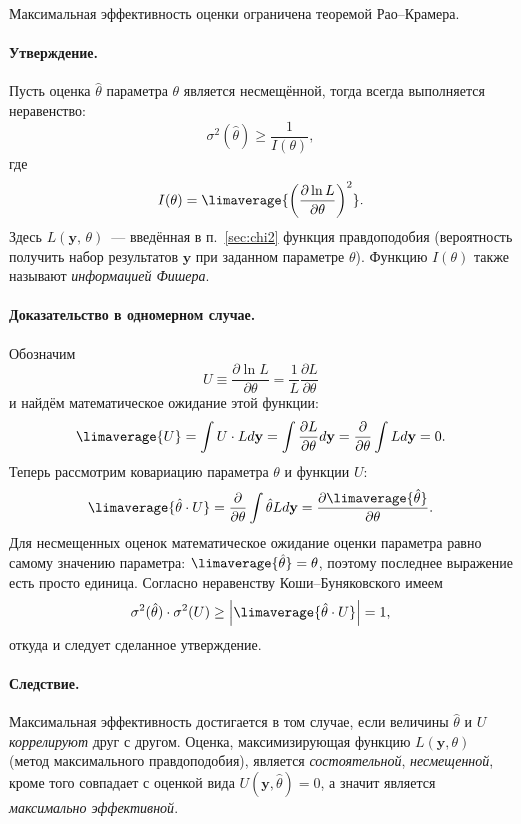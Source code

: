 Максимальная эффективность оценки ограничена теоремой Рао--Крамера.
\paragraph{Утверждение.}
Пусть оценка $\hat\theta$ параметра $\theta$ является несмещённой, тогда
всегда выполняется неравенство:
\begin{equation}
  \sigma^2(\hat\theta) \geq \frac{1}{I(\theta)},
\end{equation}
где
\begin{equation}
    I(\theta) =
    \limaverage{\left(\frac{\partial \ln L}{\partial \theta}\right)^2}.
\end{equation}
Здесь $L(\mathbf{y},\,\theta)$~--- введённая в п.~\ref{sec:chi2} функция правдоподобия
(вероятность получить набор результатов $\mathbf{y}$ при заданном параметре
$\theta$). Функцию $I(\theta)$ также называют \emph{информацией Фишера}.

\paragraph{Доказательство в одномерном случае.}
Обозначим
\[
U \equiv \frac{\partial \ln L} {\partial \theta} =
\frac{1}{L}\frac{\partial L}{\partial \theta}
\]
и найдём математическое ожидание этой функции:
\[
\limaverage{U} =
\int U\cdot L  d\mathbf{y} =
\int \frac{\partial L}{\partial \theta} d\mathbf{y} =
\frac{\partial}{\partial \theta} \int{L d\mathbf{y}} = 0.
\]
Теперь рассмотрим ковариацию параметра $\theta$ и функции
$U$:
\begin{equation}
\limaverage{\hat\theta\cdot U} 
= \frac{\partial}{\partial \theta} \int{\hat\theta L d\mathbf{y}} =
\frac{\partial \limaverage{\hat\theta}}{\partial \theta}.
\end{equation}
Для несмещенных оценок математическое ожидание оценки параметра равно
самому значению параметра: $\limaverage{\hat{\theta}} = \theta$,
поэтому последнее выражение есть просто единица.
Согласно неравенству Коши--Буняковского имеем
\[
\sigma^2 (\hat\theta) \cdot \sigma^2 (U) \geq
\left| \limaverage{\hat\theta \cdot U} \right| = 1,
\]
откуда и следует сделанное утверждение.

\paragraph{Следствие.}
Максимальная эффективность достигается в том случае, если величины
$\hat\theta$ и $U$ \emph{коррелируют} друг с другом.
Оценка, максимизирующая функцию $L(\mathbf{y},\theta)$
(метод максимального правдоподобия), является \emph{состоятельной},
\emph{несмещенной}, кроме того совпадает с оценкой вида
$U(\mathbf{y}, \hat\theta) = 0$, а значит является \emph{максимально эффективной}.


